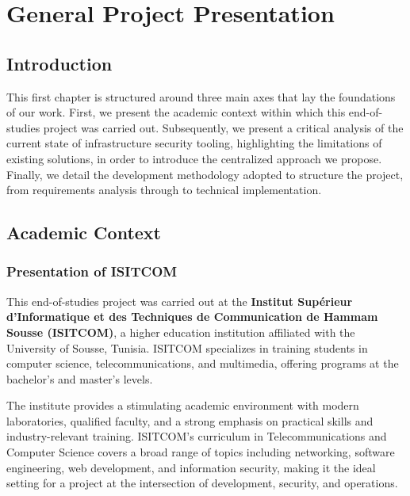 
\chapter{General Project Presentation}

\section{Introduction}

This first chapter is structured around three main axes that lay the foundations of our work. First, we present the academic context within which this end-of-studies project was carried out. Subsequently, we present a critical analysis of the current state of infrastructure security tooling, highlighting the limitations of existing solutions, in order to introduce the centralized approach we propose. Finally, we detail the development methodology adopted to structure the project, from requirements analysis through to technical implementation.

\section{Academic Context}

\subsection{Presentation of ISITCOM}

This end-of-studies project was carried out at the \textbf{Institut Supérieur d'Informatique et des Techniques de Communication de Hammam Sousse (ISITCOM)}, a higher education institution affiliated with the University of Sousse, Tunisia. ISITCOM specializes in training students in computer science, telecommunications, and multimedia, offering programs at the bachelor's and master's levels.

The institute provides a stimulating academic environment with modern laboratories, qualified faculty, and a strong emphasis on practical skills and industry-relevant training. ISITCOM's curriculum in Telecommunications and Computer Science covers a broad range of topics including networking, software engineering, web development, and information security, making it the ideal setting for a project at the intersection of development, security, and operations.

